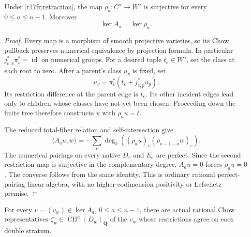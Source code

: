 \begin{lemma}
\label{r17fr:rho-surjective}
Under \eqref{r17fr:retraction}, the map
$\rho_a:C^a\to W^a$ is surjective for every $0\le a\le n-1$.
Moreover
\[
                          \ker A_a=\ker\rho_a.
 \tag{FR17.2}\label{r17fr:kernel}
\]
\end{lemma}

\begin{proof}
Every map is a morphism of smooth projective varieties, so its
Chow pullback preserves numerical equivalence by projection
formula.  In particular $j_{e,v}^*\pi_v^*=\operatorname{id}$
on numerical groups.  For a desired tuple $t_e\in W^a$,
set the class at each root to zero.  After a parent's class
$u_p$ is fixed, set
\[
                u_v=\pi_v^*(t_e+j_{e,p}^*u_p).
\]
Its restriction difference at the parent edge is $t_e$.
Its other incident edges lead only to children whose classes
have not yet been chosen.  Proceeding down the finite tree
therefore constructs $u$ with $\rho_au=t$.

The reduced total-fiber relation and self-intersection give
\[
 \langle A_au,w\rangle
      =-\sum_e\deg_k((\rho_au)_e(\rho_{n-1-a}w)_e).
 \tag{FR17.3}\label{r17fr:energy}
\]
The numerical pairings on every native $D_v$ and $E_e$ are
perfect.  Since the second restriction map is surjective
in the complementary degree, $A_au=0$ forces
$\rho_au=0$.  The converse follows from the same identity.
This is ordinary rational perfect-pairing linear algebra,
with no higher-codimension positivity or Lefschetz premise.
\end{proof}

\begin{proposition}
\label{r17fr:Chow}
For every $v=(v_w)\in\ker A_a$, $0\le a\le n-1$, there
are actual rational Chow representatives
$\zeta_w\in\operatorname{CH}^a(D_w)_{\mathbf Q}$ of the
$v_w$ whose restrictions agree on each double stratum.
\end{proposition}

